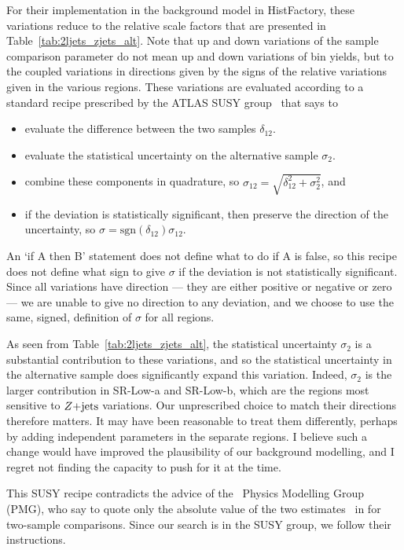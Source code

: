 For their implementation in the background model in HistFactory, these
variations reduce to the relative scale factors that are presented in
Table~\ref{tab:2ljets_zjets_alt}.
Note that up and down variations of the sample comparison parameter do not
mean up and down variations of bin yields, but to the coupled variations
in directions given by the signs of the relative variations given in the
various regions.
These variations are evaluated according to a standard recipe prescribed by
the ATLAS SUSY group~\cite{atlas_twiki_susytheoretical} that says to
\begin{itemize}
\item evaluate the difference between the two samples $\delta_{12}$.
\item evaluate the statistical uncertainty on the alternative sample $\sigma_2$.
\item combine these components in quadrature, so
$\sigma_{12} = \sqrt{\delta_{12}^2 + \sigma_2^2}$, and
\item if the deviation is statistically significant, then preserve the direction
of the uncertainty, so $\sigma = \mathrm{sgn}(\delta_{12})\sigma_{12}$.
\end{itemize}
An `if A then B' statement does not define what to do if A is false, so
this recipe does not define what sign to give $\sigma$ if the deviation is not
statistically significant.
Since all variations have direction
--- they are either positive or negative or zero ---
we are unable to give no direction to any deviation, and we choose to
use the same, signed, definition of $\sigma$ for all regions.

As seen from Table~\ref{tab:2ljets_zjets_alt}, the statistical uncertainty
$\sigma_2$ is a substantial contribution to these variations, and so
the statistical uncertainty in the alternative sample does significantly
expand this variation.
Indeed, $\sigma_2$ is the larger contribution in SR-Low-a and SR-Low-b, which
are the regions most sensitive to $Z\mathrm{+jets}$ variations.
Our unprescribed choice to match their directions therefore matters.
It may have been reasonable to treat them differently, perhaps by adding
independent parameters in the separate regions.
I believe such a change would have improved the plausibility of our background
modelling, and I regret not finding the capacity to push for it at the time.

This SUSY recipe contradicts the advice of the \atlas\ Physics Modelling Group
(PMG), who say to quote only the absolute value of the two
estimates~\cite{atlas_twiki_pmg_theory} in for two-sample
comparisons.
Since our search is in the SUSY group, we follow their instructions.


